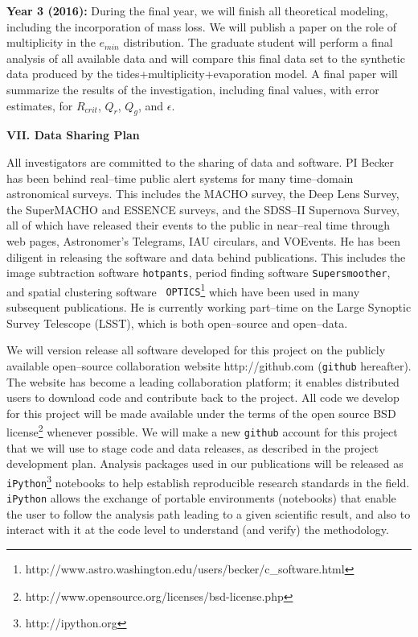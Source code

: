 {\bf Year 3 (2016):} During the final year, we will finish all
theoretical modeling, including the incorporation of mass loss.  We
will publish a paper on the role of multiplicity in the $e_{min}$
distribution. The graduate student will perform a final analysis of
all available \kepler data and will compare this final data set to the
synthetic data produced by the tides+multiplicity+evaporation model.
A final paper will summarize the results of the investigation,
including final values, with error estimates, for $R_{crit}$, $Q_r$,
$Q_g$, and $\epsilon$.  


\bigskip
\centerline{\bf VII. Data Sharing Plan}
\smallskip

All investigators are committed to the sharing of data and software.
PI Becker has been behind real--time public alert systems for many
time--domain astronomical surveys.  This includes the MACHO survey,
the Deep Lens Survey, the SuperMACHO and ESSENCE surveys, and the
SDSS--II Supernova Survey, all of which have released their events to
the public in near--real time through web pages, Astronomer's
Telegrams, IAU circulars, and VOEvents.  He has been diligent in
releasing the software and data behind publications.  This includes
the image subtraction software {\tt hotpants}, period finding software
{\tt Supersmoother}, and spatial clustering software {\tt
  OPTICS}\footnote{http://www.astro.washington.edu/users/becker/c\_software.html}
which have been used in many subsequent publications.  He is currently
working part--time on the Large Synoptic Survey Telescope (LSST),
which is both open--source and open--data.

We will version release all software developed for this project on the
publicly available open--source collaboration website
http://github.com ({\tt github} hereafter).  The website has become a
leading collaboration platform; it enables distributed users to
download code and contribute back to the project.  All code we develop
for this project will be made available under the terms of the open
source BSD
license\footnote{http://www.opensource.org/licenses/bsd-license.php}
whenever possible.  We will make a new {\tt github} account for this
project that we will use to stage code and data releases, as described
in the project development plan.  Analysis packages used in our
publications will be released as {\tt
iPython}\footnote{http://ipython.org} notebooks to help establish
reproducible research standards in the field.  {\tt iPython} allows
the exchange of portable environments (notebooks) that enable the user
to follow the analysis path leading to a given scientific result, and
also to interact with it at the code level to understand (and verify)
the methodology.


